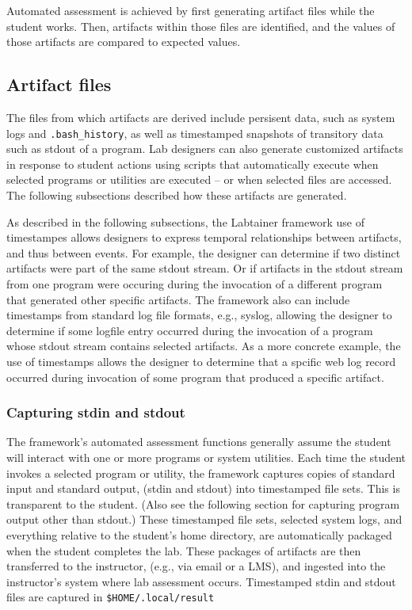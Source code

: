 \documentclass[12pt]{article}
\begin{document}
Automated assessment is achieved by first generating artifact files while the student works. 
Then, artifacts within those files are identified, and the values of those artifacts are compared to expected values.

\subsection{Artifact files}
The files from which artifacts are derived include persisent data, such as system logs and 
{\tt .bash\_history}, as well as 
timestamped snapshots of transitory data such as stdout of a program.  Lab designers can also generate
customized artifacts in response to student actions using scripts that automatically execute when selected
programs or utilities are executed -- or when selected files are accessed.   The following subsections
described how these artifacts are generated.

As described in the following subsections, the Labtainer framework use of timestampes allows 
designers to express temporal 
relationships between artifacts, and thus between events.  For example, the designer can determine if
two distinct artifacts were part of the same stdout stream.  Or if artifacts in the stdout stream from one 
program were occuring during the invocation of a different program that generated other specific artifacts.  
The framework also can include 
timestamps from standard log file formats, e.g., syslog, allowing the designer to determine if some logfile
entry occurred during the invocation of a program whose stdout stream contains selected artifacts.
As a more concrete example, the use of timestamps allows the designer to determine that a spcific web log
record occurred during invocation of some program that produced a specific artifact.

\subsubsection{Capturing stdin and stdout}
The framework's automated assessment functions generally assume the student will interact with one or
more programs or system utilities.  Each time the student invokes a selected program or utility, the 
framework captures copies of standard input and standard output, (stdin and stdout) into timestamped file sets.
This is transparent to the student.  (Also see the following section for capturing
program output other than stdout.)  These timestamped file sets, selected system logs,  and everything relative to
the student's home directory, are automatically packaged when the student completes the lab.
These packages of artifacts are then transferred to the instructor, (e.g., via email or a LMS), and 
ingested into the instructor's system where lab assessment occurs. Timestamped stdin and stdout files
are captured in \texttt{\$HOME/.local/result}
\end{document}
